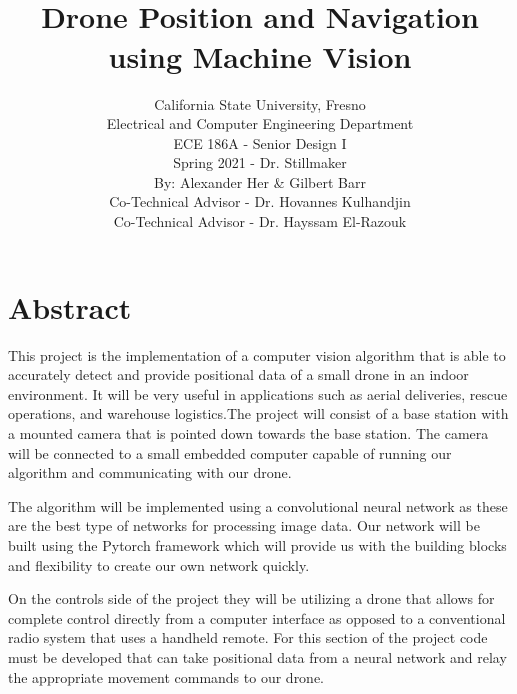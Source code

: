 \documentclass[12pt,onecolumn]{IEEEtran}			%
\title{ \hfill  \vspace{2in} \\ Drone Position and Navigation using Machine Vision  \vspace{1in} }	%
\author{California State University, Fresno \\
Electrical and Computer Engineering Department \\
ECE 186A - Senior Design I \\ 					%
Spring 2021 - Dr. Stillmaker \\ 					%

\vspace{12pt} 								%
By: Alexander Her 
\&
Gilbert Barr \\
Co-Technical Advisor - Dr. Hovannes Kulhandjin \\
Co-Technical Advisor - Dr. Hayssam El-Razouk
\vspace{2in}								%


\vspace{4in}}								%
\begin{document}
\maketitle									%
\thispagestyle{empty}						%
\newpage

\newpage


 


\begin{versionhistory}
  
\end{versionhistory}


\newpage 
\tableofcontents %



 
 \newpage 
 \section*{Abstract}
 This project is the implementation of a computer vision algorithm that is able to accurately detect and provide positional data of a small drone in an indoor environment. It will be very useful in applications such as aerial deliveries, rescue operations, and warehouse logistics.The project will consist of a base station with a mounted camera that is pointed down towards the base station. The camera will be connected to a small embedded computer capable of running our algorithm and communicating with our drone. 
 
 The algorithm will be implemented using a convolutional neural network as these are the best type of networks for processing image data. Our network will be built using the Pytorch framework which will provide us with the building blocks and flexibility to create our own network quickly.
 
 On the controls side of the project they will be utilizing a drone that allows for complete control directly from a computer interface as opposed to a conventional radio system that uses a handheld remote. For this section of the project code must be developed that can take positional data from a neural network and relay the appropriate movement commands to our drone.
 
\end{document}
